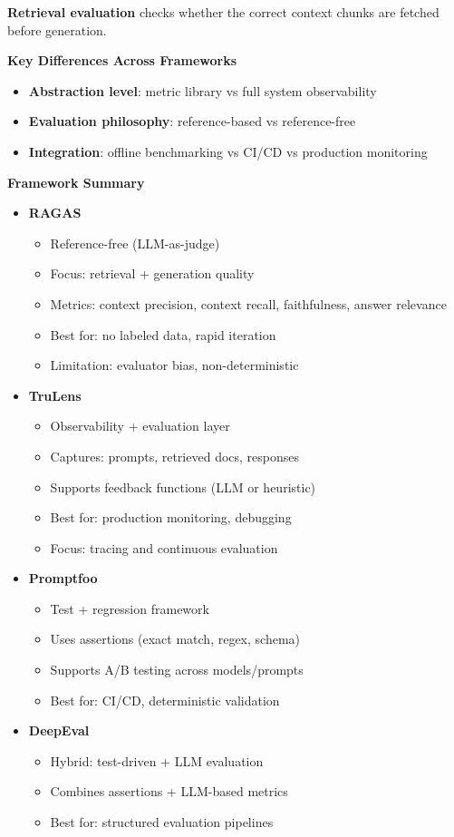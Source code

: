 \documentclass[10pt,a4paper]{article}
\begin{document}
\textbf{Retrieval evaluation} checks whether the correct context chunks are fetched before generation.

\vspace{0.5em}
\noindent
\textbf{Key Differences Across Frameworks}
\begin{itemize}
\item \textbf{Abstraction level}: metric library vs full system observability
\item \textbf{Evaluation philosophy}: reference-based vs reference-free
\item \textbf{Integration}: offline benchmarking vs CI/CD vs production monitoring
\end{itemize}

\vspace{0.5em}
\noindent
\textbf{Framework Summary}
\begin{itemize}

\item \textbf{RAGAS}
\begin{itemize}
\item Reference-free (LLM-as-judge)
\item Focus: retrieval + generation quality
\item Metrics: context precision, context recall, faithfulness, answer relevance
\item Best for: no labeled data, rapid iteration
\item Limitation: evaluator bias, non-deterministic
\end{itemize}

\item \textbf{TruLens}
\begin{itemize}
\item Observability + evaluation layer
\item Captures: prompts, retrieved docs, responses
\item Supports feedback functions (LLM or heuristic)
\item Best for: production monitoring, debugging
\item Focus: tracing and continuous evaluation
\end{itemize}

\item \textbf{Promptfoo}
\begin{itemize}
\item Test + regression framework
\item Uses assertions (exact match, regex, schema)
\item Supports A/B testing across models/prompts
\item Best for: CI/CD, deterministic validation
\end{itemize}

\item \textbf{DeepEval}
\begin{itemize}
\item Hybrid: test-driven + LLM evaluation
\item Combines assertions + LLM-based metrics
\item Best for: structured evaluation pipelines
\end{itemize}

\end{itemize}
\end{document}
